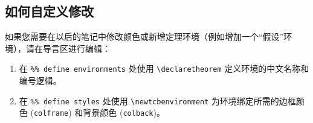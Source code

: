\documentclass[UTF8]{ctexart}
\newcommand{\newtcbenvironment}[2]{
    \tcolorboxenvironment{#1}{#2, enhanced, breakable, sharp corners, boxrule=1pt}
    \tcolorboxenvironment{#1*}{#2, enhanced, breakable, rounded corners, boxrule=1pt}
}
\begin{document}
\subsection{如何自定义修改}
如果您需要在以后的笔记中修改颜色或新增定理环境（例如增加一个“假设”环境），请在导言区进行编辑：
\begin{enumerate}
    \item 在 \verb|%% define environments| 处使用 \verb|\declaretheorem| 定义环境的中文名称和编号逻辑。
    \item 在 \verb|%% define styles| 处使用 \verb|\newtcbenvironment| 为环境绑定所需的边框颜色 (\verb|colframe|) 和背景颜色 (\verb|colback|)。
\end{enumerate}
\end{document}
